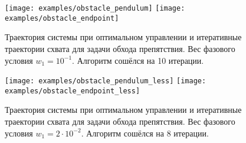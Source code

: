 \documentclass[../../doc.tex]{subfiles}
\begin{document}
    \begin{figure}[ht]
        \begin{center}
            \texttt{[image: examples/obstacle\_pendulum]}
            \texttt{[image: examples/obstacle\_endpoint]}
        \end{center}
        \caption{
            Траектория системы при оптимальном управлении и итеративные траектории схвата для задачи обхода препятствия.
            Вес фазового условия $w_1 = 10^{-1}$.
            Алгоритм сошёлся на 10 итерации.
        }
        \label{fig:obstacle-task}
    \end{figure}
    \begin{figure}[t]
        \begin{center}
            \texttt{[image: examples/obstacle\_pendulum\_less]}
            \texttt{[image: examples/obstacle\_endpoint\_less]}
        \end{center}
        \caption{
            Траектория системы при оптимальном управлении и итеративные траектории схвата для задачи обхода препятствия.
            Вес фазового условия $w_1 = 2 \cdot 10^{-2}$.
            Алгоритм сошёлся на 8 итерации.
        }
        \label{fig:obstacle-less-task}
        \vspace*{7in}
    \end{figure}

    \ifSubfilesClassLoaded{
        \nocite{*}
        \clearpage
        
        
    }{}
\end{document}
